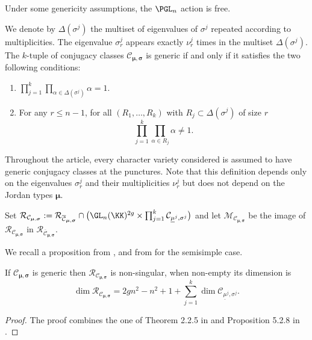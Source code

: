 Under some genericity assumptions, the $\PGL_n$ action is free.
\begin{definition}\label{def_generic_class}
We denote by $\Delta(\sigma^j)$ the multiset of eigenvalues of $\sigma^j$ repeated according to multiplicities. The eigenvalue $\sigma^j_r$ appears exactly $\nu^j_r$ times in the multiset $\Delta(\sigma^j)$. The $k$-tuple of conjugacy classes $\mathcal{C}_{\boldsymbol{\mu},\boldsymbol{\sigma}}$ is generic if and only if it satisfies the two following conditions:
\begin{enumerate}
\item\enspace
$\displaystyle\prod_{j=1}^k\prod_{\alpha \in \Delta (\sigma^j)}\alpha = 1$.
\item For any $r \le n-1$, for all $(R_1,\dots, R_k)$ with $R_j\subset \Delta(\sigma^j)$ of size $r$
\[
\prod_{j=1}^k \prod_{\alpha\in R_j} \alpha \ne 1.
\]
\end{enumerate}
Throughout the article, every character variety considered is assumed to have generic conjugacy classes at the punctures. Note that this definition depends only on the eigenvalues $\sigma^j_r$ and their multiplicities $\nu_r^j$ but does not depend on the Jordan types $\boldsymbol{\mu}$.
\end{definition}

\begin{definition}
Set $\mathcal{R}_{\mathcal{C}_{\boldsymbol{\mu},\boldsymbol{\sigma}}}:=\mathcal{R}_{\overline{\mathcal{C}}_{\boldsymbol{\mu},\boldsymbol{\sigma}}} \cap\bigl(\GL_n(\KK)^{2 g}\times \prod_{j=1}^k \mathcal{C}_{\underline{\mu}^j,\sigma^j}\bigr)$ and let $\mathcal{M}_{\mathcal{C}_{\boldsymbol{\mu},\boldsymbol{\sigma}}} $ be the image of $\mathcal{R}_{\mathcal{C}_{\boldsymbol{\mu},\boldsymbol{\sigma}}}$ in $\mathcal{R}_{\overline{\mathcal{C}}_{\boldsymbol{\mu},\boldsymbol{\sigma}}}$.
\end{definition}

We recall a proposition from \cite{Letellier13}, and from \cite{Hausel_Letellier_Villegas} for the semisimple case.

\begin{proposition}\label{prop_smooth}
If $\mathcal{C}_{\boldsymbol{\mu},\boldsymbol{\sigma}}$ is generic then $\mathcal{R}_{\mathcal{C}_{\boldsymbol{\mu},\boldsymbol{\sigma}}}$ is non-singular, when non-empty its dimension is
\[
\dim \mathcal{R}_{\mathcal{C}_{\boldsymbol{\mu},\boldsymbol{\sigma}}} = 2 g n^2 -n^2 +1 +\sum_{j=1}^k \dim \mathcal{C}_{\underline{\mu}^j,\sigma^j}.
\]
\end{proposition}
\begin{proof}
The proof combines the one of Theorem 2.2.5 in \cite{Hausel_Villegas} and Proposition 5.2.8 in \cite{Etingof_Oblomkov_Rains}.
\end{proof}

